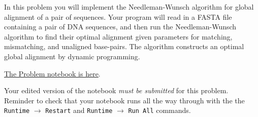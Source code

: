 \documentclass[11pt]{exam}
\begin{document}
\begin{questions}
\newpage




\question[40] In this problem you will implement the Needleman-Wunsch algorithm for global alignment of a pair of sequences. Your program will read in a FASTA file containing a pair of DNA sequences, and then run the Needleman-Wunsch algorithm to find their optimal alignment given parameters for matching, mismatching, and unaligned base-pairs. The algorithm constructs an optimal global alignment by dynamic programming.

 \href{https://github.com/pachterlab/BI-BE-CS-183-2023/blob/main/HW8/Problem3.ipynb}{The Problem notebook is here}.

 Your edited version of the notebook \textit{must be submitted } for this problem. Reminder to check that your notebook runs all the way through with the the {\tt Runtime} $\xrightarrow{}$ {\tt Restart} and {\tt Runtime} $\xrightarrow{}$ {\tt Run All} commands.

  \end{questions}
\end{document}
